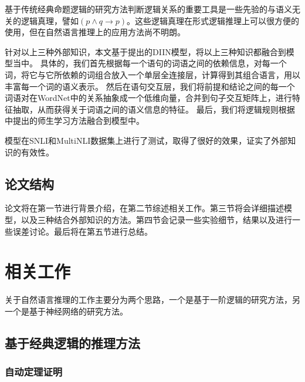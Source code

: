 \documentclass[UTF8,11pt,a4paper,nofonts]{ctexart}
\begin{document}
基于传统经典命题逻辑的研究方法判断逻辑关系的重要工具是一些先验的与语义无关的逻辑真理，譬如$(p\land q \to p)$。这些逻辑真理在形式逻辑推理上可以很方便的使用，但在自然语言推理上的应用方法尚不明朗。

针对以上三种外部知识，本文基于\cite{yichen2018nli}提出的DIIN模型，将以上三种知识都融合到模型当中。
具体的，我们首先根据每一个语句的词语之间的依赖信息，对每一个词，将它与它所依赖的词组合放入一个单层全连接层，计算得到其组合语言，用以丰富每一个词的语义表示。
然后在语句交互层，我们将前提和结论之间的每一个词语对在WordNet中的关系抽象成一个低维向量，合并到句子交互矩阵上，进行特征抽取，从而获得关于词语之间的语义信息的特征。
最后，我们将逻辑规则根据\cite{Hu2016HarnessingDN}中提出的师生学习方法融合到模型中。

模型在SNLI和MultiNLI数据集上进行了测试，取得了很好的效果，证实了外部知识的有效性。





\subsection{论文结构}

论文将在第一节进行背景介绍，在第二节综述相关工作。第三节将会详细描述模型，以及三种结合外部知识的方法。第四节会记录一些实验细节，结果以及进行一些误差讨论。最后将在第五节进行总结。

\newpage
\section{相关工作}

关于自然语言推理的工作主要分为两个思路，一个是基于一阶逻辑的研究方法，另一个是基于神经网络的研究方法。

\subsection{基于经典逻辑的推理方法}

\subsubsection{自动定理证明}
\end{document}
